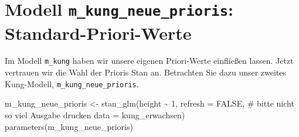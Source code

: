 \documentclass[
  ngerman,
  letterpaper,
  twoside,
  open=any]{scrbook}
\newenvironment{Shaded}{\begin{snugshade}}{\end{snugshade}}
\newcommand{\AttributeTok}[1]{\textcolor[rgb]{0.40,0.45,0.13}{#1}}
\newcommand{\CommentTok}[1]{\textcolor[rgb]{0.37,0.37,0.37}{#1}}
\newcommand{\ConstantTok}[1]{\textcolor[rgb]{0.56,0.35,0.01}{#1}}
\newcommand{\DecValTok}[1]{\textcolor[rgb]{0.68,0.00,0.00}{#1}}
\newcommand{\FunctionTok}[1]{\textcolor[rgb]{0.28,0.35,0.67}{#1}}
\newcommand{\NormalTok}[1]{\textcolor[rgb]{0.00,0.23,0.31}{#1}}
\newcommand{\OtherTok}[1]{\textcolor[rgb]{0.00,0.23,0.31}{#1}}
\newcommand{\SpecialCharTok}[1]{\textcolor[rgb]{0.37,0.37,0.37}{#1}}
\theoremstyle{definition}
\theoremstyle{plain}
\theoremstyle{definition}
\theoremstyle{definition}
\theoremstyle{definition}
\theoremstyle{definition}
\theoremstyle{remark}
\begin{document}
\section{\texorpdfstring{Modell \texttt{m\_kung\_neue\_prioris}:
Standard-Priori-Werte}{Modell m\_kung\_neue\_prioris: Standard-Priori-Werte}}\label{modell-m_kung_neue_prioris-standard-priori-werte}

Im Modell \texttt{m\_kung} haben wir unsere eigenen Priori-Werte
einfließen lassen. Jetzt vertrauen wir die Wahl der Prioris Stan an.
Betrachten Sie dazu unser zweites Kung-Modell,
\texttt{m\_kung\_neue\_prioris}.

\begin{Shaded}
\begin{Highlighting}[]
\NormalTok{m\_kung\_neue\_prioris }\OtherTok{\textless{}{-}} 
  \FunctionTok{stan\_glm}\NormalTok{(height }\SpecialCharTok{\textasciitilde{}} \DecValTok{1}\NormalTok{,}
           \AttributeTok{refresh =} \ConstantTok{FALSE}\NormalTok{,  }\CommentTok{\# bitte nicht so viel Ausgabe drucken}
           \AttributeTok{data =}\NormalTok{ kung\_erwachsen)}
\FunctionTok{parameters}\NormalTok{(m\_kung\_neue\_prioris)}
\end{Highlighting}
\end{Shaded}
\end{document}
